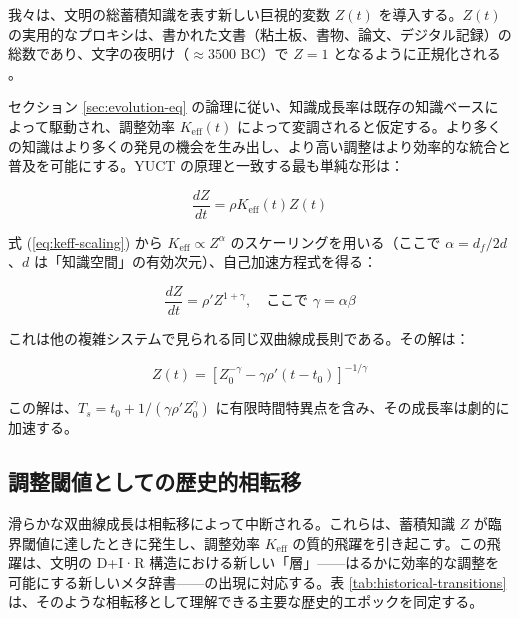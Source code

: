 \documentclass[12pt,a4paper]{article}
\newcommand{\df}{d_{\!f}}
\theoremstyle{remark}
\begin{document}
	我々は、文明の総蓄積知識を表す新しい巨視的変数 \(Z(t)\) を導入する。\(Z(t)\) の実用的なプロキシは、書かれた文書（粘土板、書物、論文、デジタル記録）の総数であり、文字の夜明け（\(\approx 3500\) BC）で \(Z=1\) となるように正規化される \cite{Buringh2009, Desai2026}。
	
	セクション \ref{sec:evolution-eq} の論理に従い、知識成長率は既存の知識ベースによって駆動され、調整効率 \(K_{\text{eff}}(t)\) によって変調されると仮定する。より多くの知識はより多くの発見の機会を生み出し、より高い調整はより効率的な統合と普及を可能にする。YUCT の原理と一致する最も単純な形は：
	
	\begin{equation}
		\frac{dZ}{dt} = \rho K_{\text{eff}}(t) Z(t)
		\label{eq:Z-growth}
	\end{equation}
	
	式 (\ref{eq:keff-scaling}) から \(K_{\text{eff}} \propto Z^{\alpha}\) のスケーリングを用いる（ここで \(\alpha = \df/2d\)、\(d\) は「知識空間」の有効次元）、自己加速方程式を得る：
	
	\begin{equation}
		\frac{dZ}{dt} = \rho' Z^{1+\gamma}, \quad \text{ここで } \gamma = \alpha \beta
		\label{eq:Z-self-accel}
	\end{equation}
	
	これは他の複雑システムで見られる同じ双曲線成長則である。その解は：
	
	\begin{equation}
		Z(t) = \left[ Z_0^{-\gamma} - \gamma \rho' (t - t_0) \right]^{-1/\gamma}
		\label{eq:Z-hyperbolic}
	\end{equation}
	
	この解は、\(T_s = t_0 + 1/(\gamma \rho' Z_0^{\gamma})\) に有限時間特異点を含み、その成長率は劇的に加速する。
	
	\subsection{調整閾値としての歴史的相転移}
	
	滑らかな双曲線成長は相転移によって中断される。これらは、蓄積知識 \(Z\) が臨界閾値に達したときに発生し、調整効率 \(K_{\text{eff}}\) の質的飛躍を引き起こす。この飛躍は、文明の D+I·R 構造における新しい「層」——はるかに効率的な調整を可能にする新しいメタ辞書——の出現に対応する。表 \ref{tab:historical-transitions} は、そのような相転移として理解できる主要な歴史的エポックを同定する。
	
\end{document}
